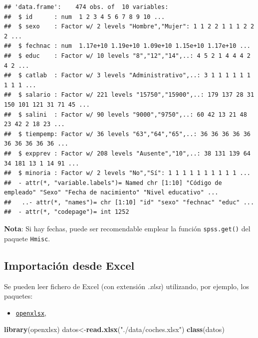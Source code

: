 \documentclass[
]{book}
\newenvironment{Shaded}{\begin{snugshade}}{\end{snugshade}}
\newcommand{\FunctionTok}[1]{\textcolor[rgb]{0.13,0.29,0.53}{\textbf{#1}}}
\newcommand{\NormalTok}[1]{#1}
\newcommand{\OtherTok}[1]{\textcolor[rgb]{0.56,0.35,0.01}{#1}}
\newcommand{\StringTok}[1]{\textcolor[rgb]{0.31,0.60,0.02}{#1}}
\providecommand{\tightlist}{%
  \setlength{\itemsep}{0pt}\setlength{\parskip}{0pt}}
\begin{document}
\begin{verbatim}
## 'data.frame':    474 obs. of  10 variables:
##  $ id      : num  1 2 3 4 5 6 7 8 9 10 ...
##  $ sexo    : Factor w/ 2 levels "Hombre","Mujer": 1 1 2 2 1 1 1 2 2 2 ...
##  $ fechnac : num  1.17e+10 1.19e+10 1.09e+10 1.15e+10 1.17e+10 ...
##  $ educ    : Factor w/ 10 levels "8","12","14",..: 4 5 2 1 4 4 4 2 4 2 ...
##  $ catlab  : Factor w/ 3 levels "Administrativo",..: 3 1 1 1 1 1 1 1 1 1 ...
##  $ salario : Factor w/ 221 levels "15750","15900",..: 179 137 28 31 150 101 121 31 71 45 ...
##  $ salini  : Factor w/ 90 levels "9000","9750",..: 60 42 13 21 48 23 42 2 18 23 ...
##  $ tiempemp: Factor w/ 36 levels "63","64","65",..: 36 36 36 36 36 36 36 36 36 36 ...
##  $ expprev : Factor w/ 208 levels "Ausente","10",..: 38 131 139 64 34 181 13 1 14 91 ...
##  $ minoria : Factor w/ 2 levels "No","Sí": 1 1 1 1 1 1 1 1 1 1 ...
##  - attr(*, "variable.labels")= Named chr [1:10] "Código de empleado" "Sexo" "Fecha de nacimiento" "Nivel educativo" ...
##   ..- attr(*, "names")= chr [1:10] "id" "sexo" "fechnac" "educ" ...
##  - attr(*, "codepage")= int 1252
\end{verbatim}

\normalsize

\textbf{Nota}: Si hay fechas, puede ser recomendable emplear la función \texttt{spss.get()} del paquete \texttt{Hmisc}.

\subsection{Importación desde Excel}\label{importaciuxf3n-desde-excel}

Se pueden leer fichero de Excel (con extensión \emph{.xlsx}) utilizando, por ejemplo, los paquetes:

\begin{itemize}
\tightlist
\item
  \href{https://cran.r-project.org/web/packages/openxlsx/index.html}{\texttt{openxlsx}},
\end{itemize}

\begin{Shaded}
\begin{Highlighting}[]
\FunctionTok{library}\NormalTok{(openxlsx)}
\NormalTok{datos}\OtherTok{\textless{}{-}}\FunctionTok{read.xlsx}\NormalTok{(}\StringTok{"./data/coches.xlsx"}\NormalTok{)}
\FunctionTok{class}\NormalTok{(datos)}
\end{Highlighting}
\end{Shaded}
\end{document}
